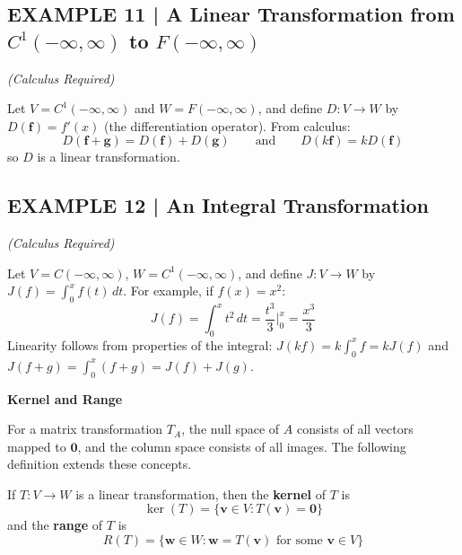\documentclass{article}
\newcommand{\redheading}[1]{{\vspace{2mm}\noindent\Large\bfseries\color{red!55!black} #1\par}\vspace{2mm}}
\begin{document}
\subsection*{EXAMPLE 11 | A Linear Transformation from $C^1(-\infty,\infty)$ to $F(-\infty,\infty)$}
\textit{(Calculus Required)}

Let $V=C^1(-\infty,\infty)$ and $W=F(-\infty,\infty)$, and define $D : V \to W$ by
$D(\mathbf{f}) = f'(x)$ (the differentiation operator). From calculus:
\[
  D(\mathbf{f}+\mathbf{g}) = D(\mathbf{f})+D(\mathbf{g}) \qquad \text{and} \qquad D(k\mathbf{f}) = kD(\mathbf{f})
\]
so $D$ is a linear transformation.

\subsection*{EXAMPLE 12 | An Integral Transformation}
\textit{(Calculus Required)}

Let $V=C(-\infty,\infty)$, $W=C^1(-\infty,\infty)$, and define $J : V \to W$ by
$J(f) = \displaystyle\int_0^x f(t)\,dt$. For example, if $f(x)=x^2$:
\[
  J(f) = \int_0^x t^2\,dt = \frac{t^3}{3}\Bigr|_0^x = \frac{x^3}{3}
\]
Linearity follows from properties of the integral: $J(kf) = k\!\int_0^x\! f = kJ(f)$ and
$J(f+g) = \int_0^x(f+g) = J(f)+J(g)$.

\vspace{2mm}

\redheading{Kernel and Range}

For a matrix transformation $T_A$, the null space of $A$ consists of all vectors mapped to
$\mathbf{0}$, and the column space consists of all images. The following definition extends
these concepts.

\begin{tcolorbox}[colback=teal!4, colframe=teal!65!black,
  title={\textbf{Definition 2}}, boxrule=0.5mm, arc=3mm]
If $T : V \to W$ is a linear transformation, then the \textbf{kernel} of $T$ is
\[
  \ker(T) = \{\mathbf{v}\in V : T(\mathbf{v}) = \mathbf{0}\}
\]
and the \textbf{range} of $T$ is
\[
  R(T) = \{\mathbf{w}\in W : \mathbf{w} = T(\mathbf{v})\text{ for some }\mathbf{v}\in V\}
\]
\end{tcolorbox}
\end{document}

